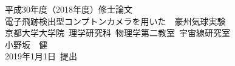 \begin{titlepage}
\begin{spacing}{2.3}

\begin{center}
\vspace*{80truept}
{\huge 平成30年度（2018年度）修士論文}\\
\vspace{30truept}
{\huge 電子飛跡検出型コンプトンカメラを用いた\ \ 豪州気球実験}\\ %
\vspace{100truept}
{\large 京都大学大学院\ 理学研究科\ 物理学第二教室\ 宇宙線研究室}\\ %
{\LARGE 小野坂　健}\\ %
{\LARGE 2019年1月1日\ 提出}\\ %

\end{center}

\end{spacing}
\end{titlepage}
